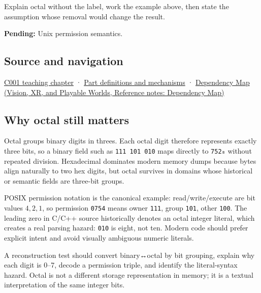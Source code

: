 Explain octal without the label, work the example above, then state the assumption whose removal would change the result.

\textbf{Pending:} Unix permission semantics.

\subsection{Source and navigation}\label{appendix-17fc1bc8b305-source-and-navigation}

\hyperref[01-foundations-i-ch001-from-a-signal-to-an-interpretation]{C001 teaching chapter} · \hyperref[appendix-fd090d982a15]{Part definitions and mechanisms} · \href{../07-Vision-XR-and-Playable-Worlds/main.pdf\#nameddest=appendix-4ad47bdd269a}{Dependency Map (Vision, XR, and Playable Worlds, Reference notes: Dependency Map)}

\subsection{Why octal still matters}\label{appendix-17fc1bc8b305-why-octal-still-matters}

Octal groups binary digits in threes. Each octal digit therefore represents exactly three bits, so a binary field such as \texttt{111\ 101\ 010} maps directly to \texttt{752₈} without repeated division. Hexadecimal dominates modern memory dumps because bytes align naturally to two hex digits, but octal survives in domains whose historical or semantic fields are three-bit groups.

POSIX permission notation is the canonical example: read/write/execute are bit values \(4,2,1\), so permission \texttt{0754} means owner \texttt{111}, group \texttt{101}, other \texttt{100}. The leading zero in C/C++ source historically denotes an octal integer literal, which creates a real parsing hazard: \texttt{010} is eight, not ten. Modern code should prefer explicit intent and avoid visually ambiguous numeric literals.

A reconstruction test should convert binary↔octal by bit grouping, explain why each digit is 0--7, decode a permission triple, and identify the literal-syntax hazard. Octal is not a different storage representation in memory; it is a textual interpretation of the same integer bits.
